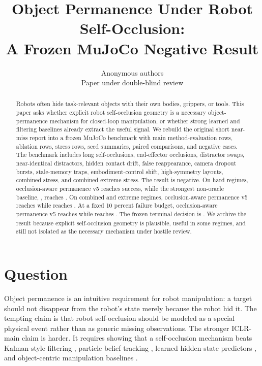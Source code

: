 \documentclass{article}
\title{Object Permanence Under Robot Self-Occlusion:\\A Frozen MuJoCo Negative Result}
\author{Anonymous authors\\Paper under double-blind review}
\newcommand{\vfive}{occlusion-aware permanence v5}
\begin{document}
\maketitle

\begin{abstract}
Robots often hide task-relevant objects with their own bodies, grippers, or tools.
This paper asks whether explicit robot self-occlusion geometry is a necessary object-permanence mechanism for closed-loop manipulation, or whether strong learned and filtering baselines already extract the useful signal.
We rebuild the original short near-miss report into a frozen MuJoCo benchmark with \MainRows{} main method-evaluation rows, \AblationRows{} ablation rows, \StressRows{} stress rows, \SeedRows{} seed summaries, \PairwiseRows{} paired comparisons, and \NegativeRows{} negative cases.
The benchmark includes long self-occlusions, end-effector occlusions, distractor swaps, near-identical distractors, hidden contact drift, false reappearance, camera dropout bursts, stale-memory traps, embodiment-control shift, high-symmetry layouts, combined stress, and combined extreme stress.
The result is negative.
On hard regimes, \vfive{} reaches \VFiveHardSuccess{} success, while the strongest non-oracle baseline, \BestHardMethod{}, reaches \BestHardSuccess{}.
On combined and extreme regimes, \vfive{} reaches \VFiveCombinedSuccess{} while \BestCombinedMethod{} reaches \BestCombinedSuccess{}.
At a fixed 10 percent failure budget, \vfive{} reaches \VFiveFixedRiskSuccess{} while \BestFixedRiskMethod{} reaches \BestFixedRiskSuccess{}.
The frozen terminal decision is \textbf{\PaperDecision{}}.
We archive the result because explicit self-occlusion geometry is plausible, useful in some regimes, and still not isolated as the necessary mechanism under hostile review.
\end{abstract}

\section{Question}
Object permanence is an intuitive requirement for robot manipulation: a target should not disappear from the robot's state merely because the robot hid it.
The tempting claim is that robot self-occlusion should be modeled as a special physical event rather than as generic missing observations.
The stronger ICLR-main claim is harder.
It requires showing that a self-occlusion mechanism beats Kalman-style filtering \citep{kalman1960new}, particle belief tracking \citep{gordon1993novel,thrun2005probabilistic}, learned hidden-state predictors \citep{breiman2001random,pedregosa2011scikit}, and object-centric manipulation baselines \citep{min2025asimo,ren2024object,daniel2026latent}.
\end{document}
